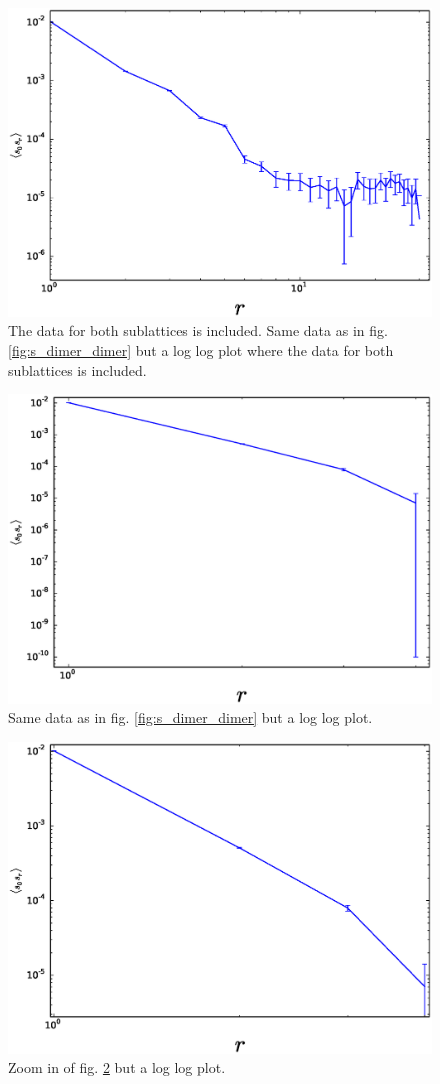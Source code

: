 \documentclass[aps,floatfix,11pt]{revtex4-1}
\begin{document}
\begin{figure}[h]
    \centering
    \includegraphics[width=8.5 cm]{s_dimer_dimer_cor_loglog_both_sublat}
    \caption{The data for both sublattices is included. Same data as in fig. \ref{fig:s_dimer_dimer} but a log log plot where the data for both
        sublattices is included.
    \label{fig:s_dimer_dimer_loglog}}
\end{figure}

\begin{figure}[h]
    \centering
    \includegraphics[width=8.5 cm]{s_dimer_dimer_cor_loglog_16x16}
    \caption{Same data as in fig. \ref{fig:s_dimer_dimer} but a log log plot.
    \label{fig:s_dimer_dimer_loglog}}
\end{figure}

\begin{figure}[h]
    \centering
    \includegraphics[width=8.5 cm]{s_dimer_dimer_cor_loglog_16x16_zoom}
    \caption{Zoom in of fig. \ref{fig:s_dimer_dimer_loglog} but a log log plot.
    \label{fig:s_dimer_dimer_loglog_zoom}}
\end{figure}
\end{document}
